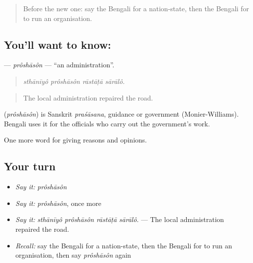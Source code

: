 \label{lesson:BN-C344-proshason}



\begin{quote}
Before the new one: say the Bengali for a nation-state, then the Bengali for to run an organisation.
\end{quote}

\subsection*{You'll want to know: }
\textbf{} — \emph{prôshāsôn} — \textquotedblleft{}an administration\textquotedblright{}.

\begin{quote}
   
\end{quote}

\begin{quote}
\emph{sthānīyô prôshāsôn rāstāṭā sārālô.}
\end{quote}

\begin{quote}
The local administration repaired the road.
\end{quote}

\begin{cousinweb}
\textbf{} (\emph{prôshāsôn}) is Sanskrit \emph{praśāsana}, guidance or government (Monier-Williams). Bengali uses it for the officials who carry out the government's work.
\end{cousinweb}

\begin{grammarlens}[title={What you've built}]
One more word for giving reasons and opinions.
\end{grammarlens}

\subsection*{Your turn}
\begin{itemize}
\raggedright
  \item \emph{Say it:} \emph{prôshāsôn}
  \item \emph{Say it:} \emph{prôshāsôn}, once more
  \item \emph{Say it:} \emph{sthānīyô prôshāsôn rāstāṭā sārālô.} — The local administration repaired the road.
  \item \emph{Recall:} say the Bengali for a nation-state, then the Bengali for to run an organisation, then say \emph{prôshāsôn} again
\end{itemize}

